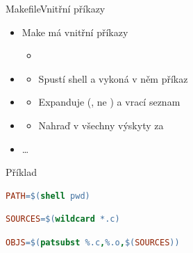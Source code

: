 \begin{frame}[fragile]{Makefile}{Vnitřní příkazy}

  \begin{itemize}
    \item Make má vnitřní příkazy
    \begin{itemize}
      \item {}
    \end{itemize}

    \pause

    \item {}
    \begin{itemize}
      \item Spustí shell a vykoná v něm příkaz 
    \end{itemize}

    \pause

    \item {}
    \begin{itemize}
      \item Expanduje  (\cmd{*}, ne \cmd{\%}) a vrací seznam
    \end{itemize}

    \pause

    \item {}
    \begin{itemize}
      \item Nahraď v  všechny výskyty  za
    \end{itemize}

    \pause

    \item \dots
  \end{itemize}


  \begin{block}{Příklad}
    \begin{lstlisting}[language=make,belowskip=0pt]
PATH=$(shell pwd)
    \end{lstlisting} %
    \begin{lstlisting}[language=make,aboveskip=0pt,belowskip=0pt]
SOURCES=$(wildcard *.c)
    \end{lstlisting} %
    \begin{lstlisting}[language=make,aboveskip=0pt]
OBJS=$(patsubst %.c,%.o,$(SOURCES))
    \end{lstlisting} %
  \end{block}

\end{frame}

